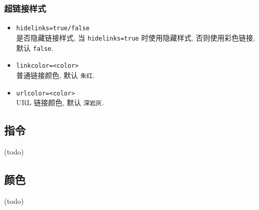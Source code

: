 \documentclass[12pt]{article}
\begin{document}
	\subsubsection{超链接样式}
	\begin{itemize}[itemsep=1ex]
		\item \texttt{hidelinks=true/false}\\
		是否隐藏链接样式, 当 \texttt{hidelinks=true} 时使用隐藏样式, 否则使用彩色链接, 默认 \texttt{false}.
		
		\item \texttt{linkcolor=<color>}\\
		普通链接颜色, 默认 \texttt{朱红}.
		
		\item \texttt{urlcolor=<color>}\\
		URL 链接颜色, 默认 \texttt{深岩灰}.
	\end{itemize}
	
	
	\subsection{指令}
	(todo)
	\subsection{颜色}
	(todo)
\end{document}
